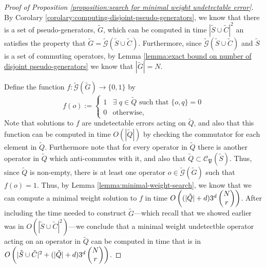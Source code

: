 \documentclass[twocolumn,showpacs,preprintnumbers,amsmath,amssymb,nofootinbib,pra,floatfix]{revtex4-1}
\newcommand{\set}{\tilde}
\newcommand{\genfun}{\tilde{\mathcal{G}}}
\newcommand{\pauligroup}{\mathfrak{P}}
\newcommand{\centralizer}{\mathcal{C}}
\begin{document}
\begin{proof}[Proof of Proposition \ref{proposition:search for minimal weight undetectable error}]
By Corolary \ref{corolary:computing-disjoint-pseudo-generators}, we know that there is a set of pseudo-generators, $\set G$, which can be computed in time $|\set S\cup\set C|^2$ an satisfies the property that $\set G=\genfun(\set S\cup\set C)$.  Furthermore, since $\genfun(\set S\cup\set C)$ and $\set S$ is a set of commuting operators, by Lemma \ref{lemma:exact bound on number of disjoint pseudo-generators} we know that $|\set G|=N$.

Define the function $f:\genfun(\set G)\to\{0,1\}$ by
$$f(o):=
\begin{cases}
1 & \exists\,\, q\in\set Q \,\,\text{such that}\,\, \{o,q\}=0\\
0 & \text{otherwise},
\end{cases}
$$
Note that solutions to $f$ are undetectable errors acting on $\set Q$, and also that this function can be computed in time $O(|\set Q|)$ by checking the commutator for each element in $\set Q$.  Furthermore note that for every operator in $\set Q$ there is another operator in $\set Q$ which anti-commutes with it, and also that $\set Q\subset \centralizer_\pauligroup(\set S)$.  Thus, since $\set Q$ is non-empty, there is at least one operator $o\in\genfun(\set G)$ such that $f(o)=1$.  Thus, by Lemma \ref{lemma:minimal-weight-search}, we know that we can compute a minimal weight solution to $f$ in time $O\paren{(|\set Q|+d)3^d\choose{N}{r}}$.  After including the time needed to construct $\set G$---which recall that we showed earlier was in $O(|\set S\cup\set C|^2)$---we conclude that a minimal weight undetectble operator acting on an operator in $\set Q$ can be computed in time that is in $O\paren{|\set S\cup\set C|^2+(|\set Q|+d)3^d\choose{N}{r}}$.
\end{proof}
\end{document}
